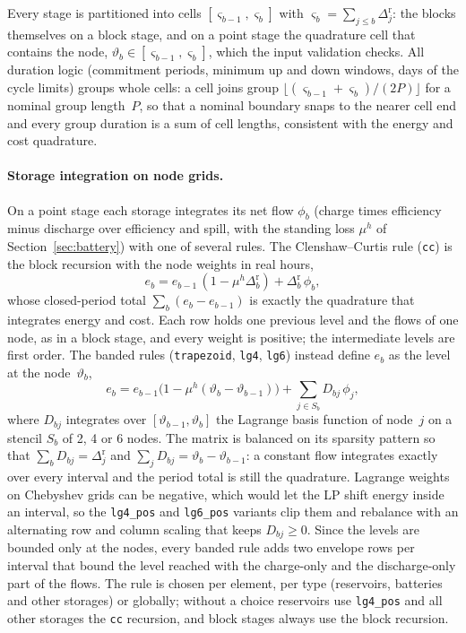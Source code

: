 Every stage is partitioned into cells $[\varsigma_{b-1},
\varsigma_b]$ with $\varsigma_b = \sum_{j \leq b} \Delta^\text{r}_j$:
the blocks themselves on a block stage, and on a point stage the
quadrature cell that contains the node, $\vartheta_b \in
[\varsigma_{b-1}, \varsigma_b]$, which the input validation checks.
All duration logic (commitment periods, minimum up and down windows,
days of the cycle limits) groups whole cells: a cell joins group
$\lfloor (\varsigma_{b-1} + \varsigma_b)/(2P) \rfloor$ for a nominal
group length~$P$, so that a nominal boundary snaps to the nearer cell
end and every group duration is a sum of cell lengths, consistent with
the energy and cost quadrature.

\paragraph{Storage integration on node grids.}
On a point stage each storage integrates its net flow $\phi_b$ (charge
times efficiency minus discharge over efficiency and spill, with the
standing loss $\mu^h$ of Section~\ref{sec:battery}) with one of several
rules.  The Clenshaw--Curtis rule (\texttt{cc}) is the block
recursion with the node weights in real hours,
\begin{equation}
\label{eq:point_cc}
e_b = e_{b-1}\,(1 - \mu^h \Delta^\text{r}_b) + \Delta^\text{r}_b\, \phi_b ,
\end{equation}
whose closed-period total $\sum_b (e_b - e_{b-1})$ is exactly the
quadrature that integrates energy and cost.  Each row holds one
previous level and the flows of one node, as in a block stage, and
every weight is positive; the intermediate levels are first order.
The banded rules (\texttt{trapezoid}, \texttt{lg4}, \texttt{lg6})
instead define $e_b$ as the level at the node~$\vartheta_b$,
\begin{equation}
\label{eq:point_banded}
e_b = e_{b-1}\bigl(1 - \mu^h(\vartheta_b - \vartheta_{b-1})\bigr)
  + \sum_{j \in S_b} D_{bj}\, \phi_j ,
\end{equation}
where $D_{bj}$ integrates over $[\vartheta_{b-1}, \vartheta_b]$ the
Lagrange basis function of node~$j$ on a stencil $S_b$ of 2, 4 or 6
nodes.  The matrix is balanced on its sparsity pattern so that
$\sum_b D_{bj} = \Delta^\text{r}_j$ and $\sum_j D_{bj} = \vartheta_b -
\vartheta_{b-1}$: a constant flow integrates exactly over every
interval and the period total is still the quadrature.  Lagrange
weights on Chebyshev grids can be negative, which would let the LP shift
energy inside an interval, so the \texttt{lg4\_pos} and
\texttt{lg6\_pos} variants clip them and rebalance with an alternating
row and column scaling that keeps $D_{bj} \geq 0$.  Since the levels are
bounded only at the nodes, every banded rule adds two envelope rows per
interval that bound the level reached with the charge-only and the
discharge-only part of the flows.  The rule is chosen per element, per
type (reservoirs, batteries and other storages) or globally; without a
choice reservoirs use \texttt{lg4\_pos} and all other storages the
\texttt{cc} recursion, and block stages always use the block recursion.

